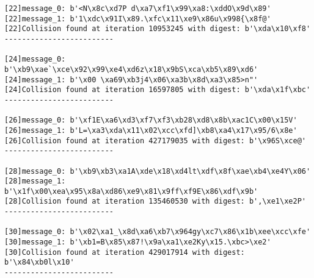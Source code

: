 \documentclass[11pt]{article}
\begin{document}
\begin{lstlisting}
[22]message_0: b'<N\x8c\xd7P d\xa7\xf1\x99\xa8:\xddO\x9d\x89'
[22]message_1: b'1\xdc\x91I\x89.\xfc\x11\xe9\x86u\x998{\x8f@'
[22]Collision found at iteration 10953245 with digest: b'\xda\x10\xf8'
-------------------------

[24]message_0: b'\xb9\xae`\xce\x92\x99\xe4\xd6z\x18\x9bS\xca\xb5\x89\xd6'
[24]message_1: b'\x00 \xa69\xb3j4\x06\xa3b\x8d\xa3\x85>n"'
[24]Collision found at iteration 16597805 with digest: b'\xda\x1f\xbc'
-------------------------

[26]message_0: b'\xf1E\xa6\xd3\xf7\xf3\xb28\xd8\x8b\xac1C\x00\x15V'
[26]message_1: b'L=\xa3\xda\x11\x02\xcc\xfd]\xb8\xa4\x17\x95/6\x8e'
[26]Collision found at iteration 427179035 with digest: b'\x96S\xce@'
-------------------------

[28]message_0: b'\xb9\xb3\xa1A\xde\x18\xd4lt\xdf\x8f\xae\xb4\xe4Y\x06'
[28]message_1: b'\x1f\x00\xea\x95\x8a\xd86\xe9\x81\x9ff\xf9E\x86\xdf\x9b'
[28]Collision found at iteration 135460530 with digest: b',\xe1\xe2P'
-------------------------

[30]message_0: b'\x02\xa1_\x8d\xa6\xb7\x964gy\xc7\x86\x1b\xee\xcc\xfe'
[30]message_1: b'\xb1=B\x85\x87!\x9a\xa1\xe2Ky\x15.\xbc>\xe2'
[30]Collision found at iteration 429017914 with digest: b'\x84\xb0l\x10'
-------------------------

\end{lstlisting}
\end{document}
